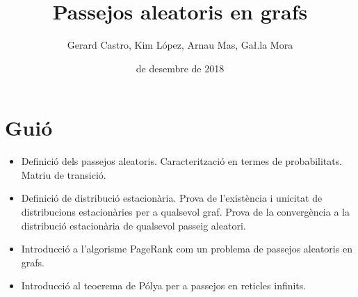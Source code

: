 \documentclass{article}
\title{\sffamily \bfseries Passejos aleatoris en grafs}
\author{\sffamily Gerard Castro, Kim López, Arnau Mas, Ga\l.la Mora}
\date{\sffamily 5 de desembre de 2018}
\numberwithin{table}{section}
\numberwithin{figure}{section}
\numberwithin{equation}{section}
\begin{document}
\maketitle
\large
\section*{Guió}
\begin{itemize}
	\item Definició dels passejos aleatoris. Caracterització en termes de probabilitats. Matriu de transició.
	\item Definició de distribució estacionària. Prova de l'existència i unicitat de distribucions estacionàries per a qualsevol graf. Prova de la convergència a la distribució estacionària de qualsevol passeig aleatori.
	\item	Introducció a l'algorisme PageRank com un problema de passejos aleatoris en grafs. 
	\item	Introducció al teoerema de Pólya per a passejos en reticles infinits. 
\end{itemize}

\nocite{*}


\end{document}
